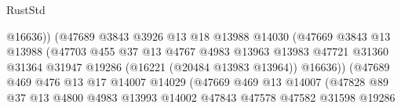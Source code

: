 \begin{lexlean}{RustStd}
\begin{coremodule}
                                            @16636))
                                        (@47689
                                          @3843
                                          @3926
                                          @13
                                          @18
                                          @13988
                                          @14030
                                          (@47669
                                            @3843
                                            @13
                                            @13988
                                            (@47703
                                              @455
                                              @37
                                              @13
                                              @4767
                                              @4983
                                              @13963
                                              @13983
                                              @47721
                                              @31360
                                              @31364
                                              @31947
                                              @19286
                                              (@16221 (@20484 @13983 @13964))
                                              @16636))
                                          (@47689
                                            @469
                                            @476
                                            @13
                                            @17
                                            @14007
                                            @14029
                                            (@47669
                                              @469
                                              @13
                                              @14007
                                              (@47828
                                                @89
                                                @37
                                                @13
                                                @4800
                                                @4983
                                                @13993
                                                @14002
                                                @47843
                                                @47578
                                                @47582
                                                @31598
                                                @19286

\end{coremodule}
\end{lexlean}
